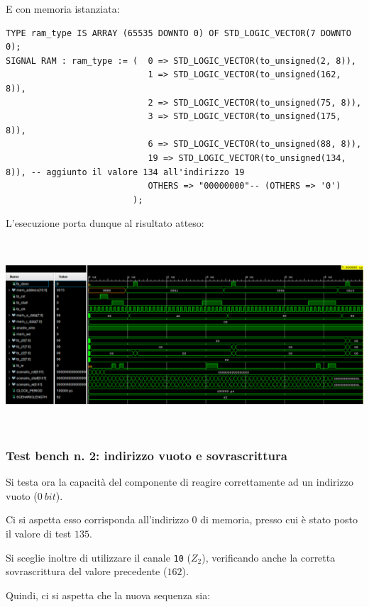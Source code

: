 \documentclass[a4paper,11pt]{article} %
\begin{document}
    E con memoria istanziata:

    \begin{verbatim}
TYPE ram_type IS ARRAY (65535 DOWNTO 0) OF STD_LOGIC_VECTOR(7 DOWNTO 0);
SIGNAL RAM : ram_type := (  0 => STD_LOGIC_VECTOR(to_unsigned(2, 8)),
                            1 => STD_LOGIC_VECTOR(to_unsigned(162, 8)),
                            2 => STD_LOGIC_VECTOR(to_unsigned(75, 8)),
                            3 => STD_LOGIC_VECTOR(to_unsigned(175, 8)),
                            6 => STD_LOGIC_VECTOR(to_unsigned(88, 8)),
                            19 => STD_LOGIC_VECTOR(to_unsigned(134, 8)), -- aggiunto il valore 134 all'indirizzo 19
                            OTHERS => "00000000"-- (OTHERS => '0')
                         );
    \end{verbatim}

    \newpage

    L'esecuzione porta dunque al risultato atteso:
    \smallskip

    \includegraphics[height=7cm]{../res/tb-1}

    \subsubsection{Test bench n. 2: indirizzo vuoto e sovrascrittura}
    Si testa ora la capacità del componente di reagire correttamente ad un indirizzo vuoto ($0\ bit$).

    Ci si aspetta esso corrisponda all'indirizzo 0 di memoria, presso cui è stato posto il valore di test $135$.

    Si sceglie inoltre di utilizzare il canale \texttt{10} ($Z_2$), verificando anche la corretta sovrascrittura del valore precedente ($162$).

    Quindi, ci si aspetta che la nuova sequenza sia:
    \medskip
\end{document}
